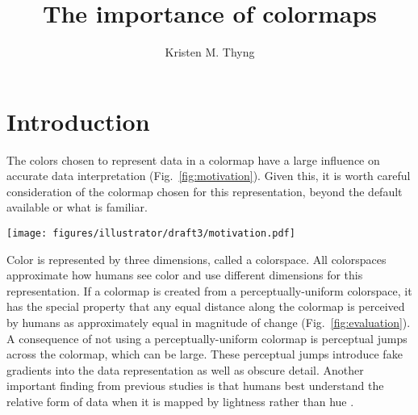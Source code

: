 \documentclass[10pt,journal,compsoc]{IEEEtran}
\begin{document}
\title{The importance of colormaps}



\author{%
	Kristen M. Thyng
	}




\maketitle


\section{Introduction}

The colors chosen to represent data in a colormap have a large influence on accurate data interpretation (Fig.~\ref{fig:motivation}). Given this, it is worth careful consideration of the colormap chosen for this representation, beyond the default available or what is familiar.

\begin{figure*}
	\texttt{[image: figures/illustrator/draft3/motivation.pdf]}
	\caption{}
	\label{fig:motivation}
\end{figure*}

\nocite{treinish1998should}
\nocite{borkin2011evaluation}
\nocite{thyng2016true}



Color is represented by three dimensions, called a colorspace. All colorspaces approximate how humans see color and use different dimensions for this representation. If a colormap is created from a perceptually-uniform colorspace, it has the special property that any equal distance along the colormap is perceived by humans as approximately equal in magnitude of change (Fig.~\ref{fig:evaluation}). A consequence of not using a perceptually-uniform colormap is perceptual jumps across the colormap, which can be large. These perceptual jumps introduce fake gradients into the data representation as well as obscure detail. Another important finding from previous studies is that humans best understand the relative form of data when it is mapped by lightness rather than hue \citep{kovesi2015good}.
\end{document}
